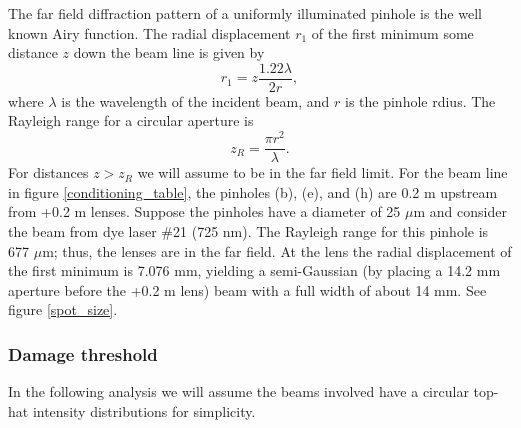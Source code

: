 The far field diffraction pattern of a uniformly illuminated pinhole is the well known Airy function. The radial displacement $r_1$ of the first minimum some distance $z$ down the beam line is given by \cite{Saleh:1991a}
\begin{equation}
r_1
=
z
\frac
{1.22\lambda}
{2r},
\end{equation}
where $\lambda$ is the wavelength of the incident beam, and $r$ is the pinhole rdius. The Rayleigh range for a circular aperture is \cite{Saleh:1991a}
\begin{equation}
z_R
=
\frac
{\pi r^2}
{\lambda}.
\end{equation}
For distances $z>z_R$ we will assume to be in the far field limit. For the beam line in figure \ref{conditioning_table}, the pinholes (b), (e), and (h) are 0.2 m upstream from +0.2 m lenses. Suppose the pinholes have a diameter of 25 $\mu$m and consider the beam from dye laser \#21 (725 nm). The Rayleigh range for this pinhole is 677 $\mu$m; thus, the lenses are in the far field. At the lens the radial displacement of the first minimum is 7.076 mm, yielding a semi-Gaussian (by placing a 14.2 mm aperture before the +0.2 m lens) beam with a full width of about 14 mm. See figure \ref{spot_size}.

\subsubsection{Damage threshold}
In the following analysis we will assume the beams involved have a circular top-hat intensity distributions for simplicity.

